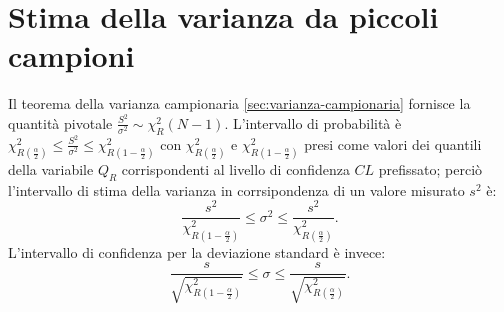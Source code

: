 \section{Stima della varianza da piccoli campioni} %
\label{sec:stima-var-piccoli}
Il teorema della varianza campionaria \ref{sec:varianza-campionaria} fornisce la quantità pivotale $\frac { S^{ 2 } }{ \sigma ^{ 2 } } \sim { \chi  }_{ R }^{ 2 }\left( N-1 \right) $. L'intervallo di probabilità è ${ \chi  }_{ R\left( \frac { \alpha  }{ 2 }  \right)  }^{ 2 }\le \frac { { S }^{ 2 } }{ { \sigma  }^{ 2 } } \le { \chi  }_{ R\left( 1-\frac { \alpha  }{ 2 }  \right)  }^{ 2 }$ con ${ \chi  }_{ R\left( \frac { \alpha  }{ 2 }  \right)  }^{ 2 }$ e ${ \chi  }_{ R\left( 1-\frac { \alpha  }{ 2 }  \right)  }^{ 2 }$ presi come valori dei quantili della variabile $Q_R$ corrispondenti al livello di confidenza $CL$ prefissato; perciò l'intervallo di stima della varianza in corrsipondenza di un valore misurato $s^2$ è:
\begin{equation}
\frac { { s }^{ 2 } }{ { \chi  }^{ 2 }_{ R\left( 1-\frac { \alpha  }{ 2 }  \right)  } } \le { \sigma  }^{ 2 }\le \frac { { s }^{ 2 } }{ { \chi  }^{ 2 }_{ R\left( \frac { \alpha  }{ 2 }  \right)  } } .
\end{equation}
L'intervallo di confidenza per la deviazione standard è invece:
\begin{equation}
\frac { { s } }{ \sqrt { { \chi  }^{ 2 }_{ R\left( 1-\frac { \alpha  }{ 2 }  \right)  } }  } \le { \sigma  }\le \frac { { s } }{ \sqrt { { \chi  }^{ 2 }_{ R\left( \frac { \alpha  }{ 2 }  \right)  } }  } .
\end{equation}


